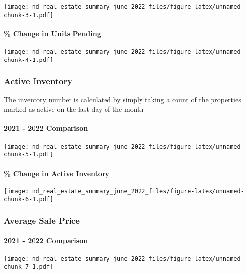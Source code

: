 \documentclass[
]{article}
\begin{document}
\texttt{[image: md\_real\_estate\_summary\_june\_2022\_files/figure-latex/unnamed-chunk-3-1.pdf]}

\hypertarget{change-in-units-pending}{%
\paragraph{\% Change in Units Pending}\label{change-in-units-pending}}

\texttt{[image: md\_real\_estate\_summary\_june\_2022\_files/figure-latex/unnamed-chunk-4-1.pdf]}

\hypertarget{active-inventory}{%
\subsubsection{Active Inventory}\label{active-inventory}}

The inventory number is calculated by simply taking a count of the
properties marked as active on the last day of the month

\hypertarget{comparison-2}{%
\paragraph{2021 - 2022 Comparison}\label{comparison-2}}

\texttt{[image: md\_real\_estate\_summary\_june\_2022\_files/figure-latex/unnamed-chunk-5-1.pdf]}

\hypertarget{change-in-active-inventory}{%
\paragraph{\% Change in Active
Inventory}\label{change-in-active-inventory}}

\texttt{[image: md\_real\_estate\_summary\_june\_2022\_files/figure-latex/unnamed-chunk-6-1.pdf]}

\hypertarget{average-sale-price}{%
\subsubsection{Average Sale Price}\label{average-sale-price}}

\hypertarget{comparison-3}{%
\paragraph{2021 - 2022 Comparison}\label{comparison-3}}

\texttt{[image: md\_real\_estate\_summary\_june\_2022\_files/figure-latex/unnamed-chunk-7-1.pdf]}
\end{document}
